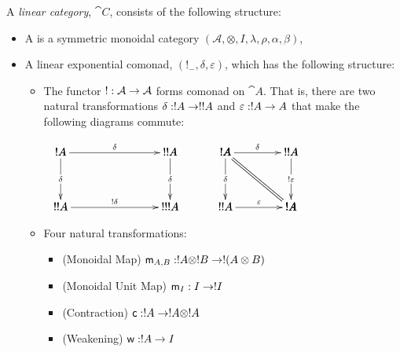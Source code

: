 \begin{definition}
  \label{def:exp-action}
  A \emph{linear category}, $\cat{C}$, consists of the following structure:
  \begin{itemize}
  \item A is a symmetric monoidal category $(\mathcal{A},\otimes,I,\lambda,\rho,\alpha,\beta)$,
  \item A linear exponential comonad,
    $(!_{-},\delta,\varepsilon)$, which has the following
    structure:
    
    \begin{itemize}    
    \item The functor $! : \mathcal{A} \rightarrow \mathcal{A}$ forms comonad
      on $\cat{A}$.  That is, there are two natural transformations
      $\delta : ! A \rightarrow !! A$ and $\varepsilon : !A \rightarrow A$ that make
      the following diagrams commute:
      \begin{center}
        \begin{math}
          \begin{array}{cccc}
            \bfig
            \square|amma|/->`->`->`->/<1000,500>[
              !A`
              !!A`
              !!A`
              !!!A;
              \delta`
              \delta`
              \delta`
              !\delta]
            \efig
            & \quad &
            \bfig
            \btriangle|mma|/->`=`->/<600,500>[
              !A`
              !!A`
              !A;
              \delta``
              \varepsilon]

            \qtriangle|amm|/->`=`->/<600,500>[
              !A`
              !!A`
              !A;
              \delta``
              !\varepsilon]
            \efig
          \end{array}
        \end{math}
      \end{center}    

    \item Four natural transformations:
      \begin{itemize}
      \item (Monoidal Map) $\mathsf{m}_{A,B} : ! A \otimes ! B \rightarrow ! (A \otimes B)$
      \item (Monoidal Unit Map) $\mathsf{m}_I : I \rightarrow ! I$
      \item (Contraction) $\mathsf{c} : !A \rightarrow !A \otimes !A$
      \item (Weakening) $\mathsf{w} : ! A \rightarrow I$
      \end{itemize}


\end{itemize}
\end{itemize}
\end{definition}
